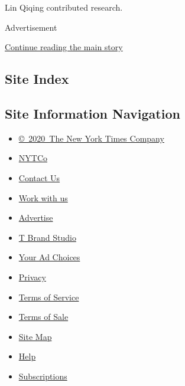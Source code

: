 Lin Qiqing contributed research.

Advertisement

\protect\hyperlink{after-bottom}{Continue reading the main story}

\hypertarget{site-index}{%
\subsection{Site Index}\label{site-index}}

\hypertarget{site-information-navigation}{%
\subsection{Site Information
Navigation}\label{site-information-navigation}}

\begin{itemize}
\tightlist
\item
  \href{https://help.nytimes3xbfgragh.onion/hc/en-us/articles/115014792127-Copyright-notice}{©~2020~The
  New York Times Company}
\end{itemize}

\begin{itemize}
\tightlist
\item
  \href{https://www.nytco.com/}{NYTCo}
\item
  \href{https://help.nytimes3xbfgragh.onion/hc/en-us/articles/115015385887-Contact-Us}{Contact
  Us}
\item
  \href{https://www.nytco.com/careers/}{Work with us}
\item
  \href{https://nytmediakit.com/}{Advertise}
\item
  \href{http://www.tbrandstudio.com/}{T Brand Studio}
\item
  \href{https://www.nytimes3xbfgragh.onion/privacy/cookie-policy\#how-do-i-manage-trackers}{Your
  Ad Choices}
\item
  \href{https://www.nytimes3xbfgragh.onion/privacy}{Privacy}
\item
  \href{https://help.nytimes3xbfgragh.onion/hc/en-us/articles/115014893428-Terms-of-service}{Terms
  of Service}
\item
  \href{https://help.nytimes3xbfgragh.onion/hc/en-us/articles/115014893968-Terms-of-sale}{Terms
  of Sale}
\item
  \href{https://spiderbites.nytimes3xbfgragh.onion}{Site Map}
\item
  \href{https://help.nytimes3xbfgragh.onion/hc/en-us}{Help}
\item
  \href{https://www.nytimes3xbfgragh.onion/subscription?campaignId=37WXW}{Subscriptions}
\end{itemize}
